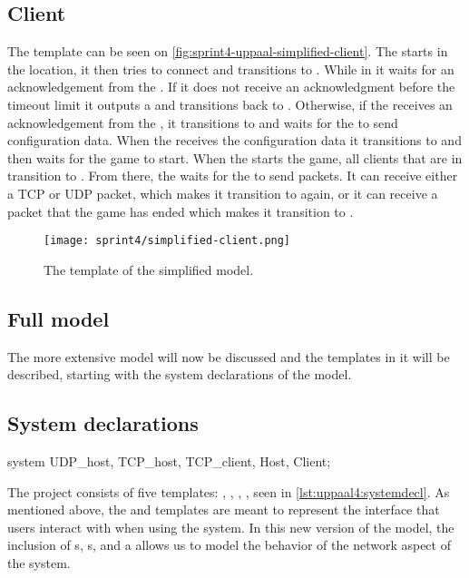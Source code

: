 \subsection*{Client}
The  template can be seen on  \autoref{fig:sprint4-uppaal-simplified-client}.
The  starts in the  location, it then tries to connect and transitions to .
While in  it waits for an acknowledgement from the .
If it does not receive an acknowledgment before the timeout limit it outputs a  and transitions back to .
Otherwise, if the  receives an acknowledgement from the , it transitions to  and waits for the  to send configuration data.
When the  receives the configuration data it transitions to  and then waits for the game to start.
When the  starts the game, all clients that are in  transition to .
From there, the  waits for the  to send packets.
It can receive either a TCP or UDP packet, which makes it transition to  again, or it can receive a packet that the game has ended which makes it transition to .
\begin{figure}[h]
    \centering
    \texttt{[image: sprint4/simplified-client.png]}
    \caption{The  template of the simplified \uppaal model.}
    \label{fig:sprint4-uppaal-simplified-client}
\end{figure}

\subsection{Full \uppaal model}
The more extensive \uppaal model will now be discussed and the templates in it will be described, starting with the system declarations of the model.

\subsection*{System declarations}
\begin{uppaalcode}[caption={System declarations}, label={lst:uppaal4:systemdecl},captionpos=b]
    system UDP_host, TCP_host, TCP_client, Host, Client;
\end{uppaalcode}
The project consists of five templates: , , , ,  seen in \autoref{lst:uppaal4:systemdecl}.
As mentioned above, the  and  templates are meant to represent the interface that users interact with when using the system.
In this new version of the model, the inclusion of s, s, and a  allows us to model the behavior of the network aspect of the system.

